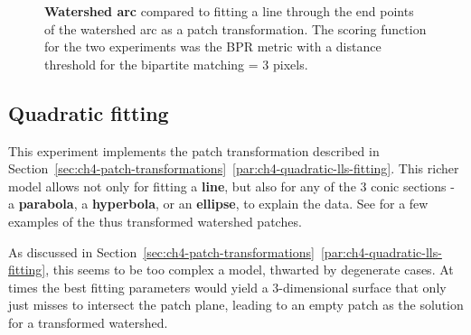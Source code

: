 \begin{figure}[ht!]
\centering
\caption[{\bf Watershed arc} compared to fitting a line as a patch transformation - plots]{{\bf Watershed arc} compared to fitting a line through the end points of the watershed arc as a patch transformation. The scoring function for the two experiments was the BPR metric with a distance threshold for the bipartite matching = 3 pixels.}
\label{fig:watershed-arc-experiment}
\end{figure}

\subsection{Quadratic fitting} %
This experiment implements the patch transformation described in Section~\ref*{sec:ch4-patch-transformations}~\ref{par:ch4-quadratic-lls-fitting}. This richer model allows not only for fitting a {\bf line}, but also for any of the 3 conic sections - a {\bf parabola}, a {\bf hyperbola}, or an {\bf ellipse}, to explain the data. See  for a few examples of the thus transformed watershed patches.

As discussed in Section~\ref*{sec:ch4-patch-transformations}~\ref{par:ch4-quadratic-lls-fitting}, this seems to be too complex a model, thwarted by degenerate cases. At times the best fitting parameters would yield a 3-dimensional surface that only just misses to intersect the patch plane, %
leading to an empty patch as the solution for a transformed watershed.

